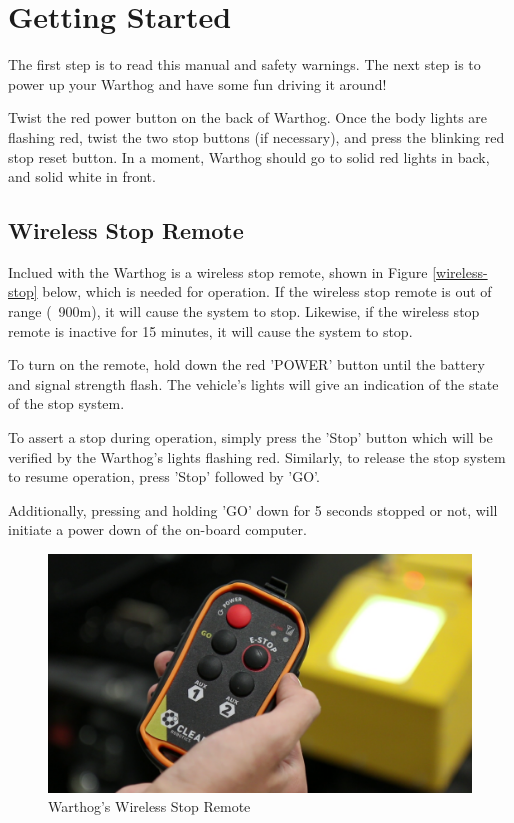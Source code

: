 \documentclass[]{clearpath-latex/clearpath-manual}
\begin{document}
\section{Getting Started}

The first step is to read this manual and safety warnings.  The next step is to power up your Warthog and have some fun driving it around!

Twist the red power button on the back of Warthog. Once the body lights are flashing red, twist the two stop buttons (if necessary), and press the blinking red stop reset button. In a moment, Warthog should go to solid red lights in back, and solid white in front.

\subsection{Wireless Stop Remote}

Inclued with the Warthog is a wireless stop remote, shown in Figure \autoref{wireless-stop} below, which is needed for operation.  If the wireless stop remote is out of range (~900m), it will cause the system to stop.
Likewise, if the wireless stop remote is inactive for 15 minutes, it will cause the system to stop.

To turn on the remote, hold down the red 'POWER' button until the battery and signal strength flash.
The vehicle's lights will give an indication of the state of the stop system.

To assert a stop during operation, simply press the 'Stop' button which will be verified by the Warthog's lights flashing red.  Similarly, to release the stop system to resume operation, press 'Stop' followed by 'GO'.

Additionally, pressing and holding 'GO' down for 5 seconds stopped or not, will initiate a power down of the on-board computer.

\begin{figure}[!h]
  \centering
  \includegraphics[width=1.0\linewidth]{wireless-stop-remote.png}
  \caption{Warthog's Wireless Stop Remote}
  \label{wireless-stop}
\end{figure}
\end{document}
